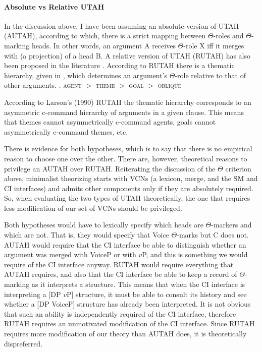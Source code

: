 \documentclass[letterpaper,12pt]{article}
\begin{document}
\paragraph{Absolute vs Relative UTAH}
In the discussion above, I have been assuming an absolute version of UTAH (AUTAH), according to which, there is a strict mapping between $\Theta$-roles and $\Theta$-marking heads.
In other words, an argument A receives $\Theta$-role X iff it merges with (a projection) of a head B.
A relative version of UTAH (RUTAH) has also been proposed in the literature \parencite[][\textit{inter alia}]{larson1990double}.
According to RUTAH there is a thematic hierarchy, given in \Next, which determines an argument's $\Theta$-role relative to that of other arguments.
\ex. \textsc{agent} $>$ \textsc{theme} $>$ \textsc{goal} $>$ \textsc{oblique} \parencite{larson1990double}

According to Larson's (1990) RUTAH the thematic hierarchy corresponds to an asymmetric c-command hierarchy of arguments in a given clause.
This means that themes cannot asymmetrically c-command agents, goals cannot asymmetrically c-command themes, etc.

There is evidence for both hypotheses, which is to say that there is no empirical reason to choose one over the other.
There are, however, theoretical reasons to privilege an AUTAH over RUTAH.
Reiterating the discussion of the $\Theta$ criterion above, minimalist theorizing starts with VCNs (a lexicon, merge, and the SM and CI interfaces) and admits other components only if they are absolutely required.
So, when evaluating the two types of UTAH theoretically, the one that requires less modification of our set of VCNs should be privileged.

Both hypotheses would have to lexically specify which heads are $\Theta$-markers and which are not.
That is, they would specify that Voice $\Theta$-marks but C does not.
AUTAH would require that the CI interface be able to distinguish whether an argument was merged with VoiceP or with $v$P, and this is something we would require of the CI interface anyway.
RUTAH would require everything that AUTAH requires, and also that the CI interface be able to keep a record of $\Theta$-marking as it interprets a structure.
This means that when the CI interface is interpreting a [DP $v$P] structure, it must be able to consult its history and see whether a [DP VoiceP] structure has already been interpreted.
It is not obvious that such an ability is independently required of the CI interface, therefore RUTAH requires an unmotivated modification of the CI interface.
Since RUTAH requires more modification of our theory than AUTAH does, it is theoretically dispreferred.
\end{document}
